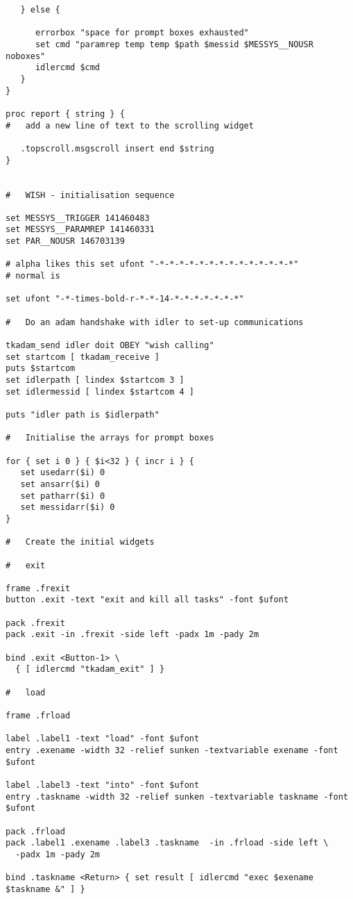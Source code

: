\begin{verbatim}
   } else {

      errorbox "space for prompt boxes exhausted" 
      set cmd "paramrep temp temp $path $messid $MESSYS__NOUSR noboxes"
      idlercmd $cmd
   }
}

proc report { string } {
#   add a new line of text to the scrolling widget

   .topscroll.msgscroll insert end $string
}


#   WISH - initialisation sequence

set MESSYS__TRIGGER 141460483
set MESSYS__PARAMREP 141460331
set PAR__NOUSR 146703139 

# alpha likes this set ufont "-*-*-*-*-*-*-*-*-*-*-*-*-*-*"
# normal is

set ufont "-*-times-bold-r-*-*-14-*-*-*-*-*-*-*"

#   Do an adam handshake with idler to set-up communications

tkadam_send idler doit OBEY "wish calling"
set startcom [ tkadam_receive ]
puts $startcom
set idlerpath [ lindex $startcom 3 ]
set idlermessid [ lindex $startcom 4 ]

puts "idler path is $idlerpath"

#   Initialise the arrays for prompt boxes

for { set i 0 } { $i<32 } { incr i } {
   set usedarr($i) 0
   set ansarr($i) 0
   set patharr($i) 0
   set messidarr($i) 0
}

#   Create the initial widgets

#   exit

frame .frexit 
button .exit -text "exit and kill all tasks" -font $ufont

pack .frexit
pack .exit -in .frexit -side left -padx 1m -pady 2m

bind .exit <Button-1> \
  { [ idlercmd "tkadam_exit" ] }

#   load

frame .frload 

label .label1 -text "load" -font $ufont
entry .exename -width 32 -relief sunken -textvariable exename -font $ufont

label .label3 -text "into" -font $ufont
entry .taskname -width 32 -relief sunken -textvariable taskname -font $ufont

pack .frload
pack .label1 .exename .label3 .taskname  -in .frload -side left \
  -padx 1m -pady 2m

bind .taskname <Return> { set result [ idlercmd "exec $exename $taskname &" ] }


\end{verbatim}
